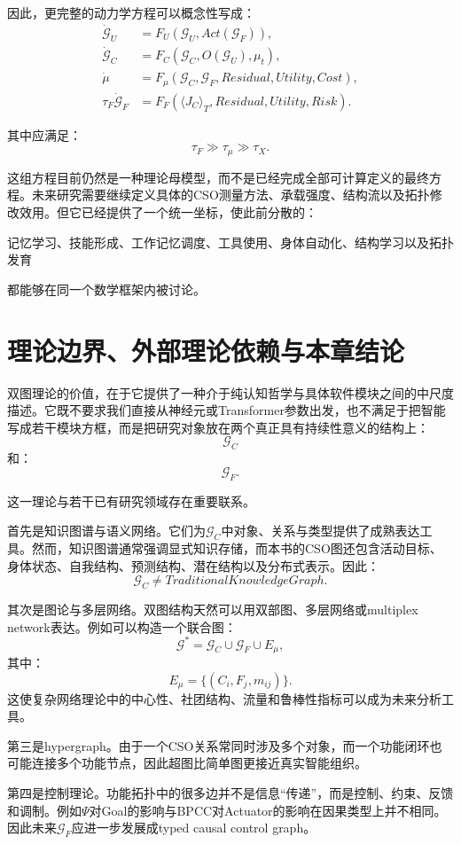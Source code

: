 因此，更完整的动力学方程可以概念性写成：
\[
\begin{aligned}
\dot{\mathcal G}_U
&=
F_U
(
\mathcal G_U,
Act(\mathcal G_F)
),\\
\dot{\mathcal G}_C
&=
F_C
(
\mathcal G_C,
O(\mathcal G_U),
\mu_t
),\\
\dot{\mu}
&=
F_\mu
(
\mathcal G_C,
\mathcal G_F,
Residual,
Utility,
Cost
),\\
\tau_F\dot{\mathcal G}_F
&=
F_F
(
\langle J_C\rangle_T,
Residual,
Utility,
Risk
).
\end{aligned}
\]

其中应满足：
\[
\tau_F
\gg
\tau_\mu
\gg
\tau_X.
\]

这组方程目前仍然是一种理论母模型，而不是已经完成全部可计算定义的最终方程。未来研究需要继续定义具体的CSO测量方法、承载强度、结构流以及拓扑修改效用。但它已经提供了一个统一坐标，使此前分散的：

记忆学习、技能形成、工作记忆调度、工具使用、身体自动化、结构学习以及拓扑发育

都能够在同一个数学框架内被讨论。

\section{理论边界、外部理论依赖与本章结论}

双图理论的价值，在于它提供了一种介于纯认知哲学与具体软件模块之间的中尺度描述。它既不要求我们直接从神经元或Transformer参数出发，也不满足于把智能写成若干模块方框，而是把研究对象放在两个真正具有持续性意义的结构上：
\[
\boxed{
\mathcal G_C
}
\]
和：
\[
\boxed{
\mathcal G_F.
}
\]

这一理论与若干已有研究领域存在重要联系。

首先是知识图谱与语义网络。它们为$\mathcal G_C$中对象、关系与类型提供了成熟表达工具。然而，知识图谱通常强调显式知识存储，而本书的CSO图还包含活动目标、身体状态、自我结构、预测结构、潜在结构以及分布式表示。因此：
\[
\mathcal G_C
\neq
TraditionalKnowledgeGraph.
\]

其次是图论与多层网络。双图结构天然可以用双部图、多层网络或multiplex network表达。例如可以构造一个联合图：
\[
\mathcal G^\ast
=
\mathcal G_C
\cup
\mathcal G_F
\cup
E_\mu,
\]
其中：
\[
E_\mu
=
\{
(C_i,F_j,m_{ij})
\}.
\]
这使复杂网络理论中的中心性、社团结构、流量和鲁棒性指标可以成为未来分析工具。

第三是hypergraph。由于一个CSO关系常同时涉及多个对象，而一个功能闭环也可能连接多个功能节点，因此超图比简单图更接近真实智能组织。

第四是控制理论。功能拓扑中的很多边并不是信息“传递”，而是控制、约束、反馈和调制。例如$\Psi$对Goal的影响与BPCC对Actuator的影响在因果类型上并不相同。因此未来$\mathcal G_F$应进一步发展成typed causal control graph。

